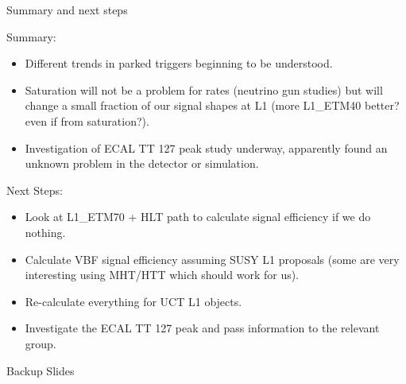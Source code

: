 \documentclass[8pt]{beamer}
\begin{document}
\begin{frame}{Summary and next steps}
 
\begin{block}{Summary:}
 
\begin{itemize}
  \item Different trends in parked triggers beginning to be understood.
  \item Saturation will not be a problem for rates (neutrino gun studies) but will change a small fraction of our signal shapes at L1 (more L1\_ETM40 better? even if from saturation?).
  \item Investigation of ECAL TT 127 peak study underway, apparently found an unknown problem in the detector or simulation. 
\end{itemize}

\end{block}

\begin{block}{Next Steps:}
 
\begin{itemize}
  \item Look at L1\_ETM70 + HLT path to calculate signal efficiency if we do nothing.
  \item Calculate VBF signal efficiency assuming SUSY L1 proposals (some are very interesting using MHT/HTT which should work for us).
  \item Re-calculate everything for UCT L1 objects.
  \item Investigate the ECAL TT 127 peak and pass information to the relevant group.
\end{itemize}
 
\end{block}

\end{frame}

\appendix
\begin{frame}
 
\begin{block}

\begin{center}Backup Slides\end{center}

\end{block}

\end{frame}

% 
\end{document}
